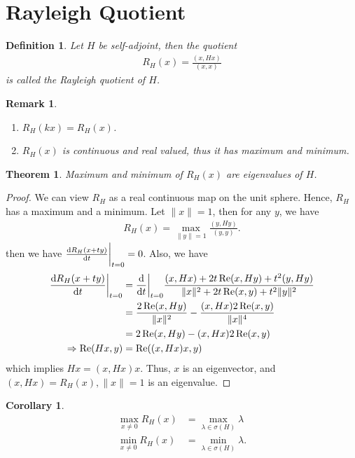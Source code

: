 \documentclass[11pt]{book}
\newtheorem{definition}{Definition}[section]
\newtheorem{theorem}{Theorem}[section]
\newtheorem{corollary}{Corollary}[section]
\newtheorem{remark}{Remark}[section]
\theoremstyle{definition}
\numberwithin{equation}{subsection}
\begin{document}
\medskip

\section{Rayleigh Quotient}

\begin{definition}
Let $H$ be self-adjoint, then the quotient
\begin{align*}
    R_H(x) = \frac{(x,Hx)}{(x,x)}
\end{align*}
is called the Rayleigh quotient of $H$.
\end{definition}

\begin{remark}
~\begin{enumerate}[label=(\arabic*)]
    \item $R_H(kx) = R_H(x)$.
    \item $R_H(x)$ is continuous and real valued, thus it has maximum and minimum.
\end{enumerate}
\end{remark}

\medskip

\begin{theorem}
Maximum and minimum of $R_H(x)$ are eigenvalues of $H$.
\end{theorem}
\begin{proof}
We can view $R_H$ as a real continuous map on the unit sphere. Hence, $R_H$ has a maximum and a minimum. Let $\|x\|=1$, then for any $y$, we have 
\begin{align*}
    R_H(x) = \max_{\|y\|=1} \frac{(y,Hy)}{(y,y)}.
\end{align*}
then we have $\dv{R_H(x+ty)}{t}\bigg|_{t = 0} = 0$. Also, we have
\begin{align*}
    \dv{R_H(x+ty)}{t}\bigg|_{t = 0} & = \dv{}{t}\bigg|_{t = 0} \frac{(x,Hx) + 2t\Re (x,Hy) + t^2 (y,Hy)}{\|x\|^2 + 2t \Re (x,y) + t^2 \|y\|^2} \\
    & = \frac{2\Re (x,Hy)}{\|x\|^2} - \frac{(x,Hx) 2 \Re (x,y)}{\|x\|^4} \\
    & = 2\Re (x,Hy) - (x,Hx) 2 \Re (x,y) \\
    \Rightarrow \Re (Hx,y) & =  \Re ((x,Hx)x,y)
\end{align*}
which implies $Hx = (x,Hx)x$. Thus, $x$ is an eigenvector, and $(x,Hx) = R_H(x), \|x\|=1$ is an eigenvalue.
\end{proof}

\medskip

\begin{corollary}
\begin{align*}
    \max_{x\neq 0}R_H(x) & = \max_{\lambda\in \sigma(H)}\lambda \\
    \min_{x\neq 0}R_H(x) & = \min_{\lambda\in \sigma(H)}\lambda.
\end{align*}
\end{corollary}
\end{document}
